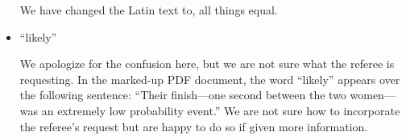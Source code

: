 \documentclass[12pt]{article}
\begin{document}
\begin{itemize}
  We have changed the Latin text to, all things equal.
  
\item ``likely''

  We apologize for the confusion here, but we are not sure what the
  referee is requesting.  In the marked-up PDF document, the word
  ``likely'' appears over the following sentence: ``Their finish---one
  second between the two women---was an extremely low probability
  event.''  We are not sure how to incorporate the referee's request
  but are happy to do so if given more information.

\end{itemize}

 
\end{document}
